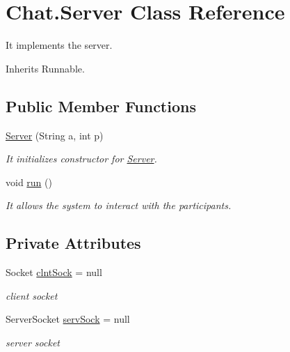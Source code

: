 \hypertarget{class_chat_1_1_server}{}\section{Chat.\+Server Class Reference}
\label{class_chat_1_1_server}


It implements the server.  




Inherits Runnable.

\subsection*{Public Member Functions}
\begin{DoxyCompactItemize}
\item 
\hyperlink{class_chat_1_1_server_a3d7288f69967e91d0f3dbfb148f4270b}{Server} (String a, int p)
\begin{DoxyCompactList}\small\item\em It initializes constructor for \hyperlink{class_chat_1_1_server}{Server}. \end{DoxyCompactList}\item 
\mbox{\label{class_chat_1_1_server_a90f3bd24ca99aa3ebf510d1f41b245c3}} 
void \hyperlink{class_chat_1_1_server_a90f3bd24ca99aa3ebf510d1f41b245c3}{run} ()
\begin{DoxyCompactList}\small\item\em It allows the system to interact with the participants. \end{DoxyCompactList}\end{DoxyCompactItemize}
\subsection*{Private Attributes}
\begin{DoxyCompactItemize}
\item 
\mbox{\label{class_chat_1_1_server_ac1ee7f354d453923201032c2935cff01}} 
Socket \hyperlink{class_chat_1_1_server_ac1ee7f354d453923201032c2935cff01}{clnt\+Sock} = null
\begin{DoxyCompactList}\small\item\em client socket \end{DoxyCompactList}\item 
\mbox{\label{class_chat_1_1_server_a60349fdcc93e1fecff4152dd85dddc88}} 
Server\+Socket \hyperlink{class_chat_1_1_server_a60349fdcc93e1fecff4152dd85dddc88}{serv\+Sock} = null
\begin{DoxyCompactList}\small\item\em server socket \end{DoxyCompactList}\end{DoxyCompactItemize}



